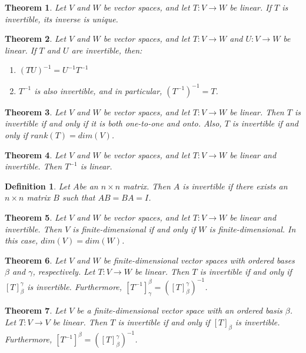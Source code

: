 \documentclass[a4paper]{article}
\newtheorem{mytheorem}{Theorem}
\newtheorem{mydef}{Definition}
\numberwithin{mytheorem}{section}
\numberwithin{mydef}{section}
\numberwithin{example}{section}
\begin{document}
\begin{mytheorem} Let $V$ and $W$ be vector spaces, and let $T: V \rightarrow W$ be linear. If $T$ is invertible, its inverse is unique.
\end{mytheorem}

\begin{mytheorem} Let $V$ and $W$ be vector spaces, and let $T: V \rightarrow W$ and $U: V \rightarrow W$ be linear. If $T$ and $U$ are invertible, then:
\begin{enumerate} 
\item $(TU)^{-1} = U^{-1}T^{-1}$
\item $T^{-1}$ is also invertible, and in particular, $(T^{-1})^{-1} = T$. 
\end{enumerate}
\end{mytheorem}

\begin{mytheorem} Let $V$ and $W$ be vector spaces, and let $T: V \rightarrow W$ be linear. Then $T$ is invertible if and only if it is both one-to-one and onto. Also, $T$ is invertible if and only if $rank(T) = dim(V)$.
\end{mytheorem}

\begin{mytheorem} Let $V$ and $W$ be vector spaces, and let $T: V \rightarrow W$ be linear and invertible. Then $T^{-1}$ is linear.
\end{mytheorem}

\begin{mydef} Let $A$be an $n \times n$ matrix. Then $A$ is invertible if there exists an $n \times n$ matrix $B$ such that $AB = BA = I$.
\end{mydef}

\begin{mytheorem} Let $V$ and $W$ be vector spaces, and let $T: V \rightarrow W$ be linear and invertible. Then $V$ is finite-dimensional if and only if $W$ is finite-dimensional. In this case, $dim(V) = dim(W)$.
\end{mytheorem}

\begin{mytheorem} Let $V$ and $W$ be finite-dimensional vector spaces with ordered bases $\beta$ and $\gamma$, respectively. Let $T: V \rightarrow W$ be linear. Then $T$ is invertible if and only if $[T]^{\gamma}_{\beta}$ is invertible. Furthermore, $[T^{-1}]^{\beta}_{\gamma} = ([T]^{\gamma}_{\beta})^{-1}$. 
\end{mytheorem}

\begin{mytheorem} Let $V$ be a finite-dimensional vector space with an ordered basis $\beta$. Let $T: V \rightarrow V$ be linear. Then $T$ is invertible if and only if $[T]_{\beta}$ is invertible. Furthermore, $[T^{-1}]^{\beta}= ([T]^{\gamma}_{\beta})^{-1}$. 
\end{mytheorem}
\end{document}
